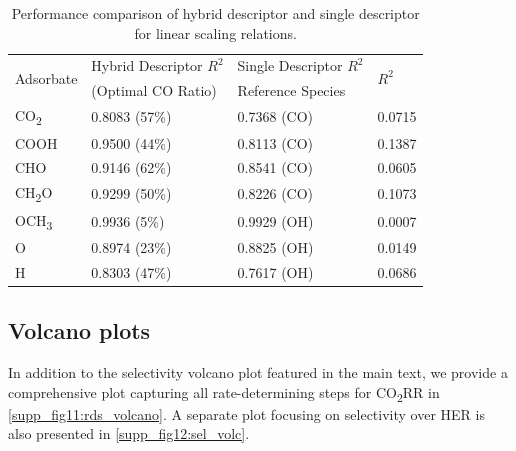 \documentclass[a4paper, 12pt]{article}
\begin{document}
\begin{table}[htbp]
\label{supp_table14:hybrid_des_perf}
  \caption{Performance comparison of hybrid descriptor and single
    descriptor for linear scaling relations.}
  \small
  \center
  \begin{tabularx}{0.75\textwidth}{@{}l *{3}{X} @{}}
    \toprule
    \multirow{2}{*}{Adsorbate} & Hybrid Descriptor $R^2$ & Single Descriptor $R^2$ & \multirow{2}{*}{$R^2$} \\
                               & (Optimal CO Ratio)      & Reference Species       &                        \\
    \midrule
    CO\textsubscript{2}   & 0.8083 (57\%)  & 0.7368 (CO)  & 0.0715  \\
    COOH                  & 0.9500 (44\%)  & 0.8113 (CO)  & 0.1387  \\
    CHO                   & 0.9146 (62\%)  & 0.8541 (CO)  & 0.0605  \\
    CH\textsubscript{2}O  & 0.9299 (50\%)  & 0.8226 (CO)  & 0.1073  \\
    OCH\textsubscript{3}  & 0.9936 (5\%)   & 0.9929 (OH)  & 0.0007  \\
    O                     & 0.8974 (23\%)  & 0.8825 (OH)  & 0.0149  \\
    H                     & 0.8303 (47\%)  & 0.7617 (OH)  & 0.0686  \\
    \bottomrule
  \end{tabularx}
\end{table}

\subsection{Volcano plots}
\label{supp_sec2.6_volcano}

In addition to the selectivity volcano plot featured in the main text, we provide a comprehensive plot capturing all rate-determining steps for CO\textsubscript{2}RR in \cref{supp_fig11:rds_volcano}. A separate plot focusing on selectivity over HER is also presented in \cref{supp_fig12:sel_volc}.
\end{document}
